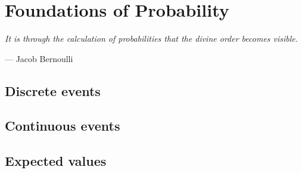\chapter{Foundations of Probability}
\label{chapter2}

\epigraph{\textit{It is through the calculation of probabilities that the divine order becomes visible.}}{— Jacob Bernoulli}

\section{Discrete events}

\section{Continuous events}

\section{Expected values}
